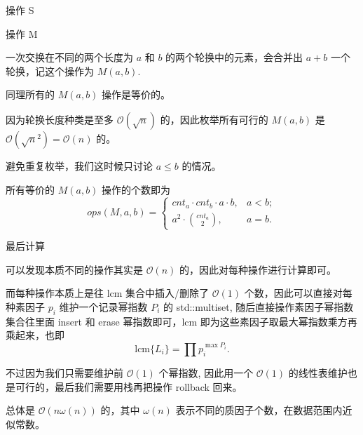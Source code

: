 \documentclass{beamer}
\newcommand{\TT}[1] {{\ttfamily #1}}
\begin{document}
{\begin{frame}{操作 S}
\end{frame}


\begin{frame}{操作 M}

一次交换在不同的两个长度为 $a$ 和 $b$ 的两个轮换中的元素，会合并出 $a + b$ 一个轮换，记这个操作为 $M(a, b)$.

同理所有的 $M(a, b)$ 操作是等价的。

因为轮换长度种类是至多 $\mathcal{O}(\sqrt n)$ 的，因此枚举所有可行的 $M(a, b)$ 是 $\mathcal{O}(\sqrt{n}^2) = \mathcal{O}(n)$ 的。

避免重复枚举，我们这时候只讨论 $a \le b$ 的情况。

所有等价的 $M(a, b)$ 操作的个数即为
\[
  ops(M, a, b) = \begin{cases}
    cnt_a \cdot cnt_b \cdot a \cdot b, &a < b;\\
    a^2 \cdot \binom{cnt_a}{2} , & a = b.
  \end{cases}
\]

\end{frame}


\begin{frame}{最后计算}

可以发现本质不同的操作其实是 $\mathcal{O}(n)$ 的，因此对每种操作进行计算即可。

而每种操作本质上是往 lcm 集合中插入/删除了 $\mathcal{O}(1)$ 个数，因此可以直接对每种素因子 $p_i$ 维护一个记录幂指数 $P_i$ 的 \TT{std::multiset}, 随后直接操作素因子幂指数集合往里面 \TT{insert} 和 \TT{erase} 幂指数即可，lcm 即为这些素因子取最大幂指数乘方再乘起来，也即 \[
  \text{lcm}\{L_i\} = \prod p_i^{\max P_i}.
\]

不过因为我们只需要维护前 $\mathcal{O}(1)$ 个幂指数, 因此用一个 $\mathcal{O}(1)$ 的线性表维护也是可行的，最后我们需要用栈再把操作 rollback 回来。

总体是 $\mathcal{O}(n\omega(n))$ 的，其中 $\omega(n)$ 表示不同的质因子个数，在数据范围内近似常数。

\end{frame}


}
\end{document}
